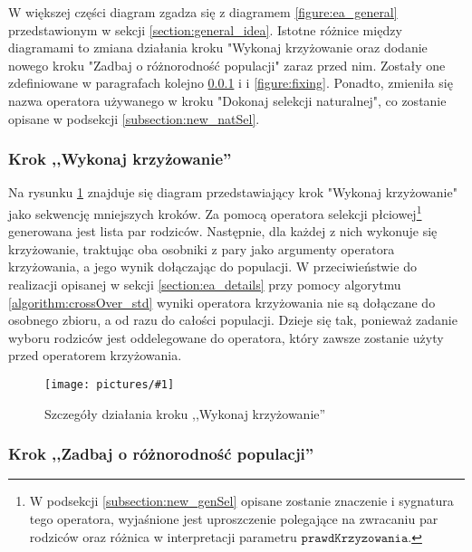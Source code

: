 \documentclass[twoside]{iisthesis}
\newcommand{\param}[1]{\mathtt{#1}}
\newcommand{\img}[1]{\texttt{[image: pictures/\#1]}}
\begin{document}
W większej części diagram zgadza się z diagramem \ref{figure:ea_general} przedstawionym w sekcji \ref{section:general_idea}. 
Istotne różnice między diagramami to zmiana działania kroku "Wykonaj krzyżowanie oraz dodanie nowego kroku "Zadbaj o różnorodność populacji" zaraz przed nim. 
Zostały one zdefiniowane w paragrafach kolejno \ref{subsubsection:my_crossover} i  i \ref{figure:fixing}. 
Ponadto, zmieniła się nazwa operatora używanego w kroku "Dokonaj selekcji naturalnej", co zostanie opisane w podsekcji \ref{subsection:new_natSel}.

\subsubsection{Krok ,,Wykonaj krzyżowanie''} \label{subsubsection:my_crossover}


Na rysunku \ref{figure:my_crossover} znajduje się diagram przedstawiający krok "Wykonaj krzyżowanie" jako sekwencję mniejszych kroków. Za pomocą operatora selekcji płciowej\footnote{
	W podsekcji \ref{subsection:new_genSel} opisane zostanie znaczenie i sygnatura tego operatora, wyjaśnione jest uproszczenie polegające na zwracaniu par rodziców oraz różnica w interpretacji parametru $\param{prawdKrzyzowania}$. 
} generowana jest lista par rodziców. 
Następnie, dla każdej z nich wykonuje się krzyżowanie, traktując oba osobniki z pary jako argumenty operatora krzyżowania, a jego wynik dołączając do populacji. 
W przeciwieństwie do realizacji opisanej w sekcji \ref{section:ea_details} przy pomocy algorytmu \ref{algorithm:crossOver_std} wyniki operatora krzyżowania nie są dołączane do osobnego zbioru, a od razu do całości populacji. 
Dzieje się tak, ponieważ zadanie wyboru rodziców jest oddelegowane do operatora, który zawsze zostanie użyty przed operatorem krzyżowania.

\begin{figure}[h]
	\caption{Szczegóły działania kroku ,,Wykonaj krzyżowanie'' \label{figure:my_crossover}}
	\img{my_crossover.png}
\end{figure}

\subsubsection{Krok ,,Zadbaj o różnorodność populacji''} \label{subsubsection:fixing}
\end{document}
